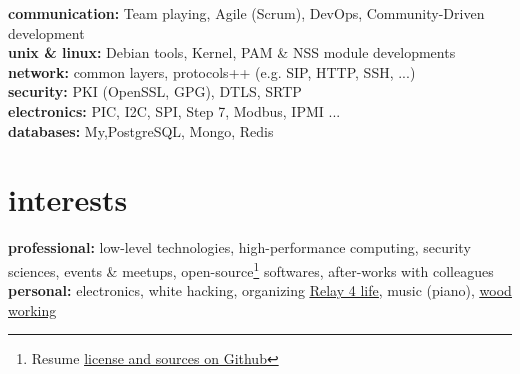 \documentclass[]{friggeri-cv} %
\begin{document}
\textbf{communication:} Team playing, Agile (Scrum), DevOps, Community-Driven development \\
\textbf{unix \& linux:} Debian tools, Kernel, PAM \& NSS module developments \\
\textbf{network:} common layers, protocols++ (e.g. SIP, HTTP, SSH, ...) \\
\textbf{security:} PKI (OpenSSL, GPG), DTLS, SRTP \\ 
\textbf{electronics:} PIC, I2C, SPI, Step 7, Modbus, IPMI ... \\
\textbf{databases:} {My,Postgre}SQL, Mongo, Redis \\
 


\section{interests}

\textbf{professional:} low-level technologies, high-performance computing, security sciences, events \& meetups, open-source\footnote{Resume \href{https://github.com/rmedaer/me}{\ul{license and sources on Github}}} softwares, after-works with colleagues \\
\textbf{personal:} electronics, white hacking, organizing \href{http://www.relaispourlavie.be/relays/braine-lalleud-2017#block-views-stkrfl-contacts-main-block-1}{\ul{Relay 4 life}}, music (piano), \href{https://www.lairdubois.fr/pas-a-pas/268-meuble-tv-chester-2.html}{\ul{wood working}}
\end{document}
